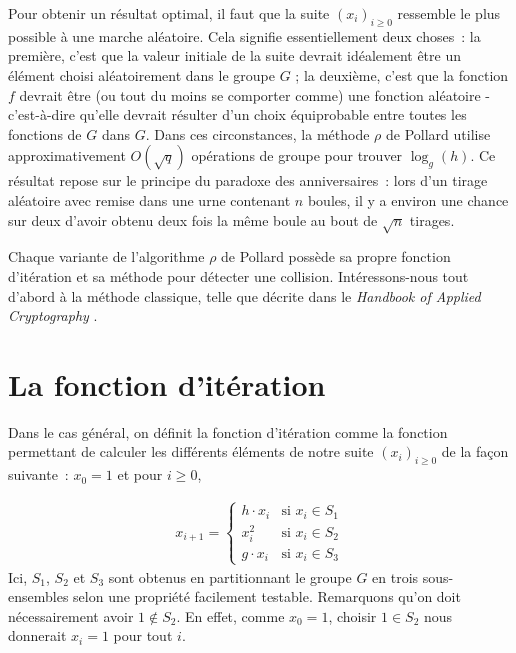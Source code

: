       Pour obtenir un résultat optimal, il faut que la suite $(x_i)_{i \ge 0}$ ressemble le plus possible à une marche aléatoire. Cela signifie essentiellement deux choses~: la première, c'est que la valeur initiale de la suite devrait idéalement être un élément choisi aléatoirement dans le groupe $G$ ; la deuxième, c'est que la fonction $f$ devrait être (ou tout du moins se comporter comme) une fonction aléatoire - c'est-à-dire qu'elle devrait résulter d'un choix équiprobable entre toutes les fonctions de $G$ dans $G$. Dans ces circonstances, la méthode $\rho$ de Pollard utilise approximativement $O(\sqrt{q})$ opérations de groupe pour trouver $\log_g(h)$. Ce résultat repose sur le principe du paradoxe des anniversaires~: lors d'un tirage aléatoire avec remise dans une urne contenant $n$ boules, il y a environ une chance sur deux d'avoir obtenu deux fois la même boule au bout de $\sqrt{n}$ tirages.

    	Chaque variante de l'algorithme $\rho$ de Pollard possède sa propre fonction d'itération et sa méthode pour détecter une collision. Intéressons-nous tout d'abord à la méthode classique, telle que décrite dans le \textit{Handbook of Applied Cryptography} \autocite[106]{handbook}.

        \section{La fonction d'itération}
        \label{chapter1:iteration_basique}
        Dans le cas général, on définit la fonction d'itération comme la fonction permettant de calculer les différents éléments de notre suite $(x_i)_{i \ge 0}$ de la façon suivante~: $x_0 = 1$ et pour $i \geq 0$,

        \begin{align*}
          x_{i+1} =
          \begin{cases}
            h \cdot x_i & \text{si } x_i \in S_1 \\
            x_i^2 & \text{si } x_i \in S_2 \\
            g \cdot x_i & \text{si } x_i \in S_3
          \end{cases}
        \end{align*}
        Ici, $S_1$, $S_2$ et $S_3$ sont obtenus en partitionnant le groupe $G$ en trois sous-ensembles selon une propriété facilement testable. Remarquons qu'on doit nécessairement avoir $1 \notin S_2$. En effet, comme $x_0 = 1$, choisir $1 \in S_2$ nous donnerait $x_i = 1$ pour tout $i$.

